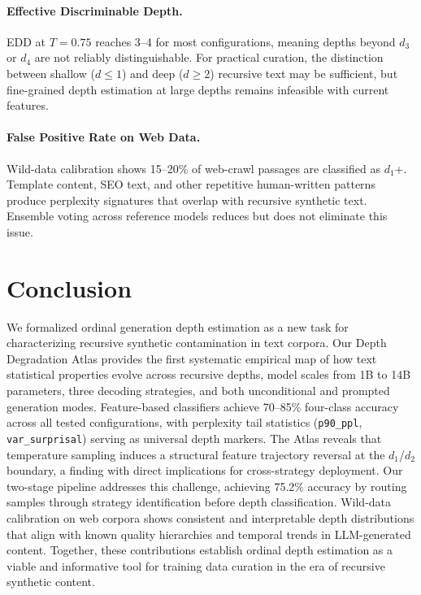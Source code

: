 \documentclass[11pt,a4paper]{article}
\newcommand{\edd}{\textsc{EDD}}
\begin{document}
\paragraph{Effective Discriminable Depth.}
\edd{} at $T=0.75$ reaches 3--4 for most configurations, meaning depths beyond $d_3$ or $d_4$ are not reliably distinguishable. For practical curation, the distinction between shallow ($d \leq 1$) and deep ($d \geq 2$) recursive text may be sufficient, but fine-grained depth estimation at large depths remains infeasible with current features.

\paragraph{False Positive Rate on Web Data.}
Wild-data calibration shows 15--20\% of web-crawl passages are classified as $d_1$+. Template content, SEO text, and other repetitive human-written patterns produce perplexity signatures that overlap with recursive synthetic text. Ensemble voting across reference models reduces but does not eliminate this issue.

\section{Conclusion}

We formalized ordinal generation depth estimation as a new task for characterizing recursive synthetic contamination in text corpora. Our Depth Degradation Atlas provides the first systematic empirical map of how text statistical properties evolve across recursive depths, model scales from 1B to 14B parameters, three decoding strategies, and both unconditional and prompted generation modes. Feature-based classifiers achieve 70--85\% four-class accuracy across all tested configurations, with perplexity tail statistics (\texttt{p90\_ppl}, \texttt{var\_surprisal}) serving as universal depth markers. The Atlas reveals that temperature sampling induces a structural feature trajectory reversal at the $d_1$/$d_2$ boundary, a finding with direct implications for cross-strategy deployment. Our two-stage pipeline addresses this challenge, achieving 75.2\% accuracy by routing samples through strategy identification before depth classification. Wild-data calibration on web corpora shows consistent and interpretable depth distributions that align with known quality hierarchies and temporal trends in LLM-generated content. Together, these contributions establish ordinal depth estimation as a viable and informative tool for training data curation in the era of recursive synthetic content.
\end{document}
